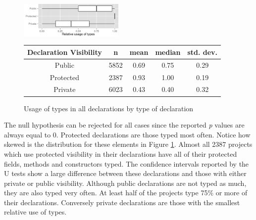 \documentclass[preprint]{sigplanconf}
\renewcommand{\arraystretch}{1.2}
\begin{document}
\begin{figure}[h]
\centering 
\includegraphics[width=0.45\textwidth]{../analysis/result/all/boxplots/23_declarations_by_visibility.png} 
\label{fig:all_boxplot_visibility_all} 

\vspace{0.3cm}

\renewcommand{\arraystretch}{1.2}
\small
\begin{tabular}{|c|c|c|c|c|}
\hline
Declaration Visibility	& n		& mean	& median	& std. dev.	\\
\hline
\hline
Public    				& 5852	& 0.69	& 0.75		& 0.29		\\ \hline
Protected 				& 2387	& 0.93	& 1.00		& 0.19		\\ \hline
Private   				& 6023	& 0.43	& 0.40		& 0.32		\\ \hline
\end{tabular}
\caption{Usage of types in all declarations by type of declaration}
\end{figure}

The null hypothesis can be rejected for all cases since the reported \emph{p} values are always equal to $0$.
Protected declarations are those typed most often.
Notice how skewed is the distribution for these elements in Figure \ref{fig:all_boxplot_visibility_all}.
Almost all 2387 projects which use protected visibility in their declarations have all of their protected fields, methods and constructors typed.
The confidence intervals reported by the U tests show a large difference between these declarations and those with either private or public visibility.
Although public declarations are not typed as much, they are also typed very often.
At least half of the projects type 75\% or more of their declarations.
Conversely private declarations are those with the smallest relative use of types.
\end{document}
